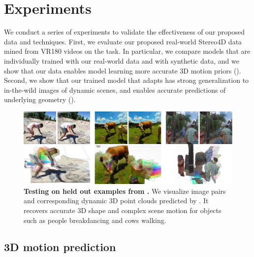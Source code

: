 \section{Experiments}





We conduct a series of experiments to validate the effectiveness of our proposed data and techniques.
First, we evaluate 
our proposed real-world Stereo4D data mined from VR180 videos on the \method task.
In particular, we compare models that are individually trained with our real-world data and with synthetic data, and we show that our data enables model learning more accurate 3D motion priors (). 
Second, we show that our trained model that adapts \duster has strong generalization to in-the-wild images of dynamic scenes, and enables accurate predictions of underlying geometry ().




\begin{figure}[ht]
\vspace{-1em}
    \centering
    \includegraphics[width=\linewidth]{fig/ours_qualitative.pdf}
    \caption{\textbf{Testing on held out examples from \dataset.} We visualize image pairs and corresponding dynamic 3D point clouds predicted by \method. 
    It recovers accurate 3D shape and complex scene motion for objects such as people breakdancing and cows walking.}
    \label{fig:result-wall-stereo4dtest}
\end{figure}

\subsection{3D motion prediction} \label{sec:motion_eval}

